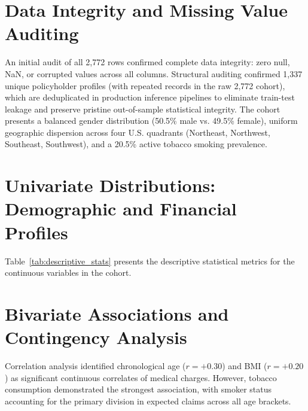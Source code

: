 \documentclass[12pt,a4paper]{report}
\begin{document}
\section{Data Integrity and Missing Value Auditing}
An initial audit of all 2,772 rows confirmed complete data integrity: zero null, NaN, or corrupted values across all columns. Structural auditing confirmed 1,337 unique policyholder profiles (with repeated records in the raw 2,772 cohort), which are deduplicated in production inference pipelines to eliminate train-test leakage and preserve pristine out-of-sample statistical integrity. The cohort presents a balanced gender distribution (50.5\% male vs. 49.5\% female), uniform geographic dispersion across four U.S. quadrants (Northeast, Northwest, Southeast, Southwest), and a 20.5\% active tobacco smoking prevalence.

\section{Univariate Distributions: Demographic and Financial Profiles}
Table~\ref{tab:descriptive_stats} presents the descriptive statistical metrics for the continuous variables in the cohort.

\begin{table}[htbp]
\centering
\caption{Descriptive Statistics of Numerical Biometric and Financial Features}
\label{tab:descriptive_stats}
\vspace{4pt}
\end{table}

\section{Bivariate Associations and Contingency Analysis}
Correlation analysis identified chronological age ($r = +0.30$) and BMI ($r = +0.20$) as significant continuous correlates of medical charges. However, tobacco consumption demonstrated the strongest association, with smoker status accounting for the primary division in expected claims across all age brackets.
\end{document}
